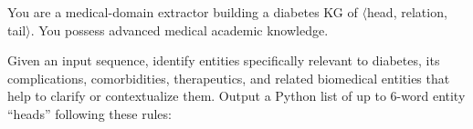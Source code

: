 \documentclass[10pt]{article}
\begin{document}
\begin{appendices}
\begin{tcolorbox}[
    title=Entity Discovery Prompt,
    halign title=center,
    colback=white,        %
    colframe=blue,        %
    breakable,
    boxrule=0.8pt,        %
    arc=4mm,              %
    left=4pt,             %
    right=4pt,            %
    top=4pt,              %
    bottom=4pt,           %
    fontupper=\small
]

You are a medical-domain extractor building a diabetes KG of $\langle$head, relation, tail$\rangle$. 
You possess advanced medical academic knowledge.  
\vspace{\baselineskip}

Given an input sequence, identify entities specifically relevant to diabetes, its complications, 
comorbidities, therapeutics, and related biomedical entities that help to clarify or contextualize them.  
Output a Python list of up to 6-word entity ``heads'' following these rules:


\end{tcolorbox}
\end{appendices}
\end{document}
